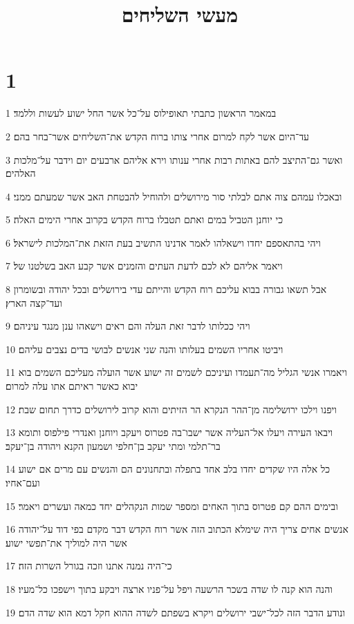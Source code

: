 

\title{מעשי השליחים}


\chapter{1}

\par 1 במאמר הראשון כתבתי תאופילוס על־כל אשר החל ישוע לעשות וללמד׃
\par 2 עד־היום אשר לקח למרום אחרי צותו ברוח הקדש את־השליחים אשר־בחר בהם׃
\par 3 ואשר גם־התיצב להם באתות רבות אחרי ענותו וירא אליהם ארבעים יום וידבר על־מלכות האלהים׃
\par 4 ובאכלו עמהם צוה אתם לבלתי סור מירושלים ולהוחיל להבטחת האב אשר שמעתם ממני׃
\par 5 כי יוחנן הטביל במים ואתם תטבלו ברוח הקדש בקרוב אחרי הימים האלה׃
\par 6 ויהי בהתאספם יחדו וישאלהו לאמר אדנינו התשיב בעת הזאת את־המלכות לישראל׃
\par 7 ויאמר אליהם לא לכם לדעת העתים והזמנים אשר קבע האב בשלטנו של׃
\par 8 אבל תשאו גבורה בבוא עליכם רוח הקדש והייתם עדי בירושלים ובכל יהודה ובשומרון ועד־קצה הארץ׃
\par 9 ויהי ככלותו לדבר זאת העלה והם ראים וישאהו ענן מנגד עיניהם׃
\par 10 ויביטו אחריו השמים בעלותו והנה שני אנשים לבושי בדים נצבים עליהם׃
\par 11 ויאמרו אנשי הגליל מה־תעמדו ועיניכם לשמים זה ישוע אשר הועלה מעליכם השמים בוא יבוא כאשר ראיתם אתו עלה למרום׃
\par 12 ויפנו וילכו ירושלימה מן־ההר הנקרא הר הזיתים והוא קרוב לירושלים כדרך תחום שבת׃
\par 13 ויבאו העירה ויעלו אל־העליה אשר ישבו־בה פטרוס ויעקב ויוחנן ואנדרי פילפוס ותומא בר־תלמי ומתי יעקב בן־חלפי ושמעון הקנא ויהודה בן־יעקב׃
\par 14 כל אלה היו שקדים יחדו בלב אחד בתפלה ובתחנונים הם והנשים עם מרים אם ישוע ועם־אחיו׃
\par 15 ובימים ההם קם פטרוס בתוך האחים ומספר שמות הנקהלים יחד כמאה ועשרים ויאמר׃
\par 16 אנשים אחים צריך היה שימלא הכתוב הזה אשר רוח הקדש דבר מקדם בפי דוד על־יהודה אשר היה למוליך את־תפשי ישוע׃
\par 17 כי־היה נמנה אתנו וזכה בגורל השרות הזה׃
\par 18 והנה הוא קנה לו שדה בשכר הרשעה ויפל על־פניו ארצה ויבקע בתוך וישפכו כל־מעיו׃
\par 19 ונודע הדבר הזה לכל־ישבי ירושלים ויקרא בשפתם לשדה ההוא חקל דמא הוא שדה הדם׃
